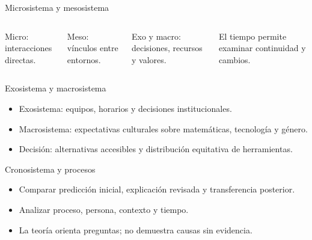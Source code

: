 \documentclass[
	spanish,
	aspectratio=1610,
	xcolor={dvipsnames,table}
]{beamer}
\begin{document}
\begin{frame}{Microsistema y mesosistema}
\begin{columns}[T,onlytextwidth]\centering{}\small
Micro: interacciones directas.\par\vspace{.25cm}Meso: vínculos entre entornos.\par\vspace{.25cm}Exo y macro: decisiones, recursos y valores.\par\vspace{.25cm}El tiempo permite examinar continuidad y cambios.\end{columns}
\end{frame}
\begin{frame}{Exosistema y macrosistema}
\fontsize{14}{18}\selectfont\begin{itemize}\setlength{\itemsep}{.45cm}
\item Exosistema: equipos, horarios y decisiones institucionales.
\item Macrosistema: expectativas culturales sobre matemáticas, tecnología y género.
\item Decisión: alternativas accesibles y distribución equitativa de herramientas.
\end{itemize}
\end{frame}
\begin{frame}{Cronosistema y procesos}
\fontsize{14}{18}\selectfont\begin{itemize}\setlength{\itemsep}{.45cm}
\item Comparar predicción inicial, explicación revisada y transferencia posterior.
\item Analizar proceso, persona, contexto y tiempo.
\item La teoría orienta preguntas; no demuestra causas sin evidencia.
\end{itemize}
\end{frame}
\end{document}
